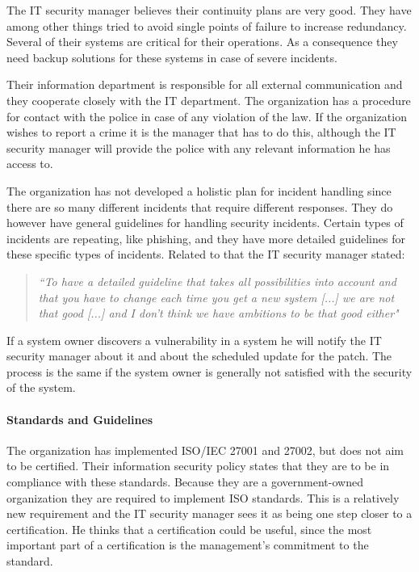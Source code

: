 The IT security manager believes their continuity plans are very good. They have among other things tried to avoid single points of failure to increase redundancy. Several of their systems are critical for their operations. As a consequence they need backup solutions for these systems in case of severe incidents. 

Their information department is responsible for all external communication and they cooperate closely with the IT department. The organization has a procedure for contact with the police in case of any violation of the law. If the organization wishes to report a crime it is the manager that has to do this, although the IT security manager will provide the police with any relevant information he has access to. 

The organization has not developed a holistic plan for incident handling since there are so many different incidents that require different responses. They do however have general guidelines for handling security incidents. Certain types of incidents are repeating, like phishing, and they have more detailed guidelines for these specific types of incidents. Related to that the IT security manager stated:

\begin{quote}
\textit{``To have a detailed guideline that takes all possibilities into account and that you have to change each time you get a new system %
[...] we are not that good [...] and I don't think we have ambitions to be that good either"}
\end{quote}

If a system owner discovers a vulnerability in a system he will notify the IT security manager about it and about the scheduled update for the patch. The process is the same if the system owner is generally not satisfied with the security of the system.

\paragraph{Standards and Guidelines}
The organization has implemented \acs{ISO}/\acs{IEC} 27001 and 27002, but does not aim to be certified. Their information security policy states that they are to be in compliance with these standards. Because they are a government-owned organization they are required to implement \acs{ISO} standards. This is a relatively new requirement and the IT security manager sees it as being one step closer to a certification. He thinks that a certification could be useful, since the most important part of a certification is the management's commitment to the standard.

